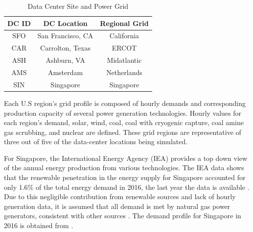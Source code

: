 \begin{table}[ht]
  \vspace{-10 pt}
  \caption{Data Center Site and Power Grid}
  \label{table:tab02}
  \centering
  \begin{tabular}{| c | c | c |  }
    \hline
    \bf{DC ID} & \bf{DC Location} & \bf{Regional Grid} \\
    \hline
    SFO & San Francisco, CA & California \\
    \hline
    CAR & Carrolton, Texas & ERCOT \\
    \hline
    ASH & Ashburn, VA & Midatlantic \\
    \hline
    AMS & Amsterdam & Netherlands \\
    \hline
    SIN & Singapore & Singapore \\
    \hline
  \end{tabular}
  \vspace{-10 pt}   %
  \end{table}

  Each U.S region's grid profile is composed of hourly demands and corresponding production capacity of several power generation technologies. Hourly values for each region’s demand, solar, wind, coal, coal with cryogenic capture, coal amine gas scrubbing, and nuclear are defined. These grid regions are representative of three out of five of the data-center locations being simulated. 
  
  For Singapore, the International Energy Agency (IEA) provides a top down view of the annual energy production from various technologies. The IEA data shows that the renewable penetration in the energy supply for Singapore accounted for only 1.6\% of the total energy demand in 2016, the last year the data is available \citep{IEA17}. Due to this negligible contribution from renewable sources and lack of hourly generation data, it is assumed that all demand is met by natural gas power generators, consistent with other sources \citep{eia20}. The demand profile for Singapore in 2016 is obtained from \citep{sin16}.

